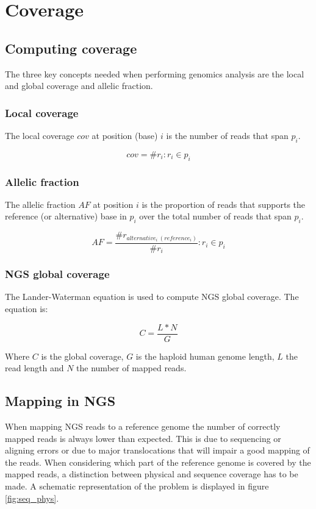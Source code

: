 \graphicspath{{chapters/notes/02/images}}
\chapter{Coverage}

\section{Computing coverage}
The three key concepts needed when performing genomics analysis are the local and global coverage and allelic fraction.

    \subsection{Local coverage}
		The local coverage $cov$ at position (base) $i$ is the number of reads that span $p_i$.

    $$cov = \# r_i : r_i \in p_i$$

    \subsection{Allelic fraction}
		The allelic fraction $AF$ at position $i$ is the proportion of reads that supports the reference (or alternative) base in $p_i$ over the total number of reads that span $p_i$.

    $$AF = \frac{\# r_{alternative_i\ (reference_i)}}{\# r_i} : r_i\in p_i$$

    \subsection{NGS global coverage}
    The Lander-Waterman equation is used to compute NGS global coverage.
    The equation is:

    $$C = \frac{L * N}{G}$$

    Where $C$ is the global coverage, $G$ is the haploid human genome length, $L$ the read length and $N$ the number of mapped reads.

\section{Mapping in NGS}
When mapping NGS reads to a reference genome the number of correctly mapped reads is always lower than expected.
This is due to sequencing or aligning errors or due to major translocations that will impair a good mapping of the reads.
When considering which part of the reference genome is covered by the mapped reads, a distinction between physical and sequence coverage has to be made.
A schematic representation of the problem is displayed in figure \ref{fig:seq_phys}.

